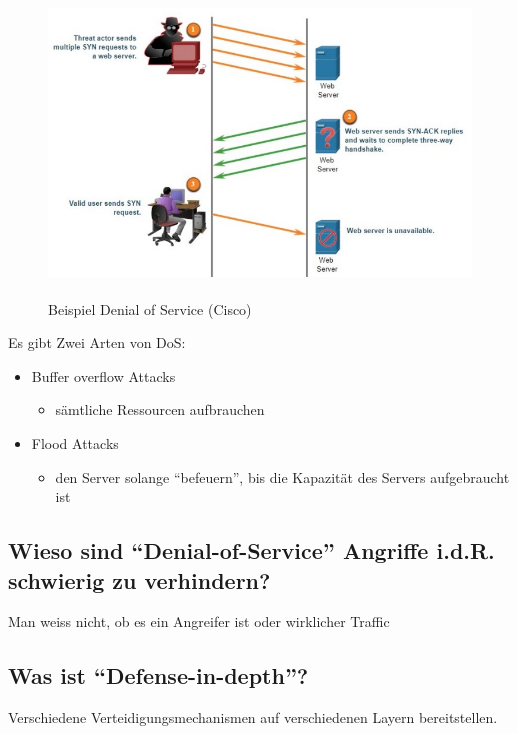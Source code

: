 \begin{figure}[H]
    \begin{center}
        \label{pic:DoS}
        \includegraphics[width=\textwidth]{images/DoS.jpg}
        \caption{Beispiel Denial of Service (\textsuperscript{\textcopyright}Cisco)}
    \end{center}
\end{figure}

Es gibt Zwei Arten von DoS:
\begin{itemize}
    \item Buffer overflow Attacks
    \begin{itemize}
        \item sämtliche Ressourcen aufbrauchen
    \end{itemize}
    \item Flood Attacks
    \begin{itemize}
        \item den Server solange "`befeuern"', bis die Kapazität des Servers aufgebraucht ist
    \end{itemize}
\end{itemize}

\subsection*{Wieso sind "`Denial-of-Service"' Angriffe i.d.R. schwierig zu verhindern?}
Man weiss nicht, ob es ein Angreifer ist oder wirklicher Traffic

\subsection*{Was ist "`Defense-in-depth"'?}
Verschiedene Verteidigungsmechanismen auf verschiedenen Layern bereitstellen.

